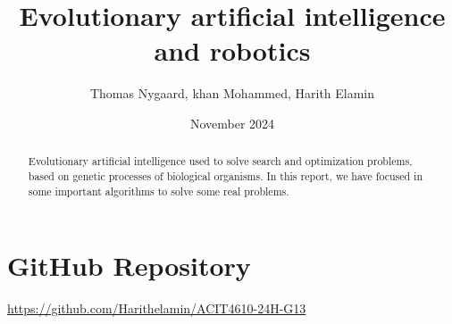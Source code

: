 \documentclass{article}
\begin{document}
\title{Evolutionary artificial intelligence and robotics}
\author{Thomas Nygaard, khan Mohammed, Harith Elamin}
\date{November 2024}

\maketitle
\begin{abstract}
      Evolutionary artificial intelligence used to solve search and optimization problems, based on genetic processes of biological organisms. In this report, we have focused in some important algorithms to solve some real problems.  
\end{abstract}

\section{GitHub Repository}
\faGithub{}
\hyperlink{target name}{https://github.com/Harithelamin/ACIT4610-24H-G13}







\printbibliography
\end{document}
